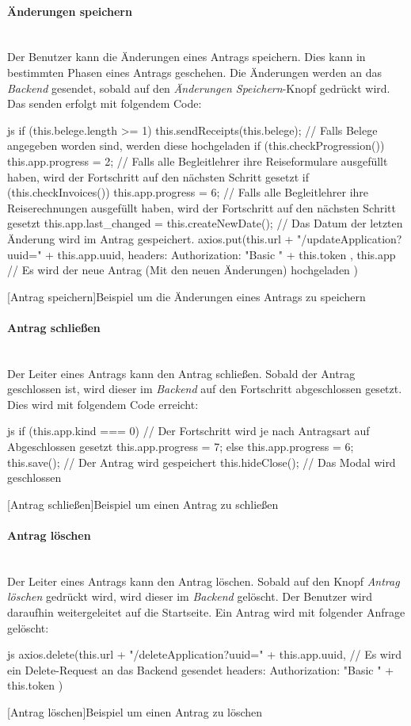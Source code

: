\paragraph{Änderungen speichern}~\\
Der Benutzer kann die Änderungen eines Antrags speichern. Dies kann in bestimmten Phasen eines Antrags geschehen. Die Änderungen werden an das \textit{Backend} gesendet, sobald auf den \textit{Änderungen Speichern}-Knopf gedrückt wird. Das senden erfolgt mit folgendem Code:
\begin{code}{js}
	if (this.belege.length >= 1) {
		this.sendReceipts(this.belege); // Falls Belege angegeben worden sind, werden diese hochgeladen
	}
	if (this.checkProgression()) {
		this.app.progress = 2;	// Falls alle Begleitlehrer ihre Reiseformulare ausgefüllt haben, wird der Fortschritt auf den nächsten Schritt gesetzt
	}
	if (this.checkInvoices()) {
		this.app.progress = 6; // Falls alle Begleitlehrer ihre Reiserechnungen ausgefüllt haben, wird der Fortschritt auf den nächsten Schritt gesetzt
	}
	this.app.last_changed = this.createNewDate(); // Das Datum der letzten Änderung wird im Antrag gespeichert.
	axios.put(this.url + "/updateApplication?uuid=" + this.app.uuid,
	{
		headers: {
			Authorization: "Basic " + this.token
		}
	},
	this.app // Es wird der neue Antrag (Mit den neuen Änderungen) hochgeladen
	)
\end{code}
[Antrag speichern]{Beispiel um die Änderungen eines Antrags zu speichern}~\\
\paragraph{Antrag schließen}~\\
Der Leiter eines Antrags kann den Antrag schließen. Sobald der Antrag geschlossen ist, wird dieser im \textit{Backend} auf den Fortschritt abgeschlossen gesetzt. Dies wird mit folgendem Code erreicht:
\begin{code}{js}
	if (this.app.kind === 0) {	// Der Fortschritt wird je nach Antragsart auf Abgeschlossen gesetzt
		this.app.progress = 7;
	} else {
		this.app.progress = 6;
	}
	this.save(); // Der Antrag wird gespeichert
	this.hideClose(); // Das Modal wird geschlossen
\end{code}
[Antrag schließen]{Beispiel um einen Antrag zu schließen}~\\
\newpage
\paragraph{Antrag löschen}~\\
Der Leiter eines Antrags kann den Antrag löschen. Sobald auf den Knopf \textit{Antrag löschen} gedrückt wird, wird dieser im \textit{Backend} gelöscht. Der Benutzer wird daraufhin weitergeleitet auf die Startseite. Ein Antrag wird mit folgender Anfrage gelöscht:
\begin{code}{js}
	axios.delete(this.url + "/deleteApplication?uuid=" + this.app.uuid, { // Es wird ein Delete-Request an das Backend gesendet
		headers: {
			Authorization: "Basic " + this.token
		}
	})
\end{code}
[Antrag löschen]{Beispiel um einen Antrag zu löschen}~\\
\newpage

